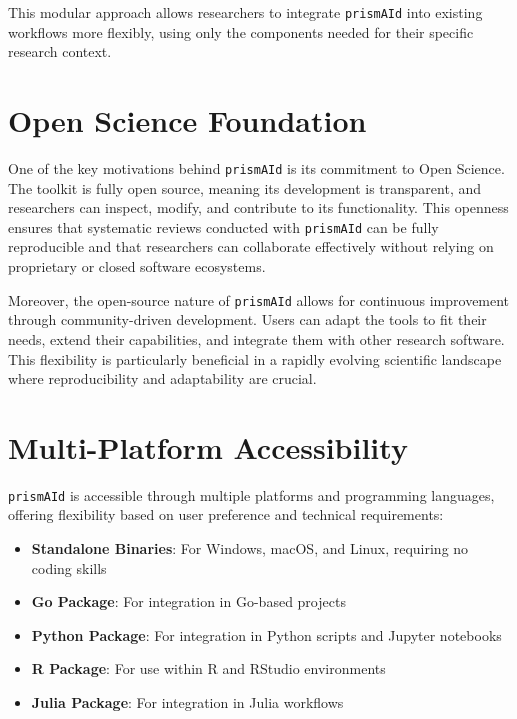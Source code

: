 This modular approach allows researchers to integrate \texttt{prismAId} into existing workflows more flexibly, using only the components needed for their specific research context.

\section{Open Science Foundation}

One of the key motivations behind \texttt{prismAId} is its commitment to Open Science. The toolkit is fully open source, meaning its development is transparent, and researchers can inspect, modify, and contribute to its functionality. This openness ensures that systematic reviews conducted with \texttt{prismAId} can be fully reproducible and that researchers can collaborate effectively without relying on proprietary or closed software ecosystems.

Moreover, the open-source nature of \texttt{prismAId} allows for continuous improvement through community-driven development. Users can adapt the tools to fit their needs, extend their capabilities, and integrate them with other research software. This flexibility is particularly beneficial in a rapidly evolving scientific landscape where reproducibility and adaptability are crucial.

\section{Multi-Platform Accessibility}

\texttt{prismAId} is accessible through multiple platforms and programming languages, offering flexibility based on user preference and technical requirements:

\begin{itemize}
    \item \textbf{Standalone Binaries}: For Windows, macOS, and Linux, requiring no coding skills
    \item \textbf{Go Package}: For integration in Go-based projects
    \item \textbf{Python Package}: For integration in Python scripts and Jupyter notebooks
    \item \textbf{R Package}: For use within R and RStudio environments
    \item \textbf{Julia Package}: For integration in Julia workflows
\end{itemize}

